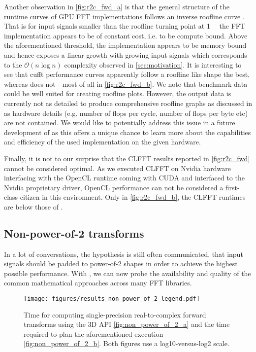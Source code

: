 Another observation in \cref{fig:r2c_fwd_a} is that the general structure of the runtime curves of GPU FFT implementations follows an inverse roofline curve \cite{williams2009roofline}. That is for input signals smaller than the roofline turning point at \SI{1}{\mebi\byte} the FFT implementation appears to be of constant cost, i.e. to be compute bound. Above the aforementioned threshold, the implementation appears to be memory bound and hence exposes a linear growth with growing input signals which corresponds to the $\mathcal{O}(n \log n)$ complexity observed in \cref{sec:motivation}. It is interesting to see that cufft performance curves apparently follow a roofline like shape the best, whereas \fftw{} does not - most of all in \cref{fig:r2c_fwd_b}.  We note that \gearshifft{} benchmark data could be well suited for creating roofline plots. However, the output data is currently not as detailed to produce comprehensive roofline graphs as discussed in \cite{ofenbeck2014applying} as hardware details (e.g. number of flops per cycle, number of flops per byte etc) are not contained. We would like to potentially address this issue in a future development of \gearshifft{} as this offers a unique chance to learn more about the capabilities and efficiency of the used implementation on the given hardware. 
 
Finally, it is not to our surprise that the CLFFT results reported in \cref{fig:r2c_fwd} cannot be considered optimal. As we executed CLFFT on Nvidia hardware interfacing with the OpenCL runtime coming with CUDA and interfaced to the Nvidia proprietary driver, OpenCL performance can not be considered a first-class citizen in this environment. Only in \cref{fig:r2c_fwd_b}, the CLFFT runtimes are below those of \fftw{}.
 
\subsection{Non-power-of-2 transforms}
\label{ssec:nonpowerof2}

In a lot of conversations, the hypothesis is still often communicated, that input signals should be padded to power-of-2 shapes in order to achieve the highest possible performance. With \gearshifft{}, we can now probe the availability and quality of the common mathematical approaches across many FFT libraries. 

\begin{figure}[!tbp]
  \centering
  \texttt{[image: figures/results\_non\_power\_of\_2\_legend.pdf]}\vspace{-1em}
  \hfill
  \caption{Time for computing single-precision real-to-complex forward transforms using the 3D API \cref{fig:non_power_of_2_a} and the time required to plan the aforementioned execution \cref{fig:non_power_of_2_b}. Both figures use a log10-versus-log2 scale.}
  \label{fig:non_power_of_2}
\end{figure}

